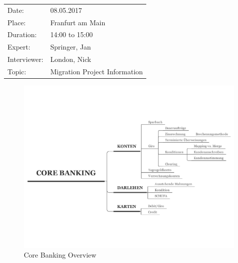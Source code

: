 \begin{tabular}{l l}
Date: & 08.05.2017 \\
Place: & Franfurt am Main \\
Duration: & 14:00 to 15:00 \\
Expert: & Springer, Jan \\
Interviewer: & London, Nick \\
Topic: & Migration Project Information
\end{tabular}

\begin{figure}[H]
    \centering
    \includegraphics{img/CoreBanking.pdf}
    \caption{Core Banking Overview}
    \label{fig:cbOver}
\end{figure}

\paragraph{}
